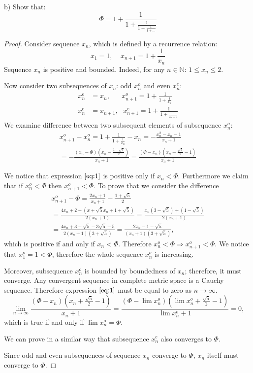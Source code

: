 \documentclass{article}
\newcommand{\N}{\mathbb{N}}
\begin{document}
\begin{tcolorbox}
b) Show that:
\[ \Phi = 1+\frac{1}{1+\frac{1}{1+\frac{1}{1+\dots}}} \]
\end{tcolorbox}

\begin{proof}

Consider sequence $x_n$, which is defined by a recurrence relation:
\[ x_1 = 1, \>\>\>\>\> x_{n+1} = 1+\frac{1}{x_n} \]
Sequence $x_n$ is positive and bounded.
Indeed, for any $n \in \N$: $1 \leq x_n \leq 2 $.

Now consider two subsequences of $x_n$: odd $x^o_n$ and even $x^e_n$:
\begin{align*}
    x^o_n & = x_n, \quad\>\>\> x^o_{n+1} = 1+\frac{1}{1+\frac{1}{x_n}} \\
    x^e_n & = x_{n+1}, \>\>\> x^e_{n+1} = 1 + \frac{1}{1+\frac{1}{x_{n+1}}}
\end{align*}
We examine difference between two subsequent elements of subsequence $x^o_{n}$:
\begin{multline} \label{eq:1}
    x^o_{n+1} - x^o_{n} 
    = 1 + \frac{1}{1+\frac{1}{x_n}} - x_n 
    = - \frac{x_n^2 - x_n - 1}{x_n + 1} \\
    = -\frac{(x_n-\Phi)(x_n-\frac{1-\sqrt{5}}{2})}{x_n+1} 
    = \frac{(\Phi-x_n)(x_n+\frac{\sqrt{5}}{2}-1)}{x_n+1}    
\end{multline}

We notice that expression $\ref{eq:1}$ is positive only if $x_n < \Phi$.
Furthermore we claim that if $x^o_n < \Phi$ then $x^o_{n+1} < \Phi$.
To prove that we consider the difference 
\begin{multline*}
    x^o_{n+1} - \Phi = \frac{2x_n+1}{x_n+1} - \frac{1+\sqrt{5}}{2} \\
    = \frac{4x_n+2-(x+\sqrt{5}x_n + 1 + \sqrt{5})}{2(x_n+1)}
    = \frac{x_n(3-\sqrt{5})+(1-\sqrt{5})}{2(x_n+1)} \\
    = \frac{4x_n + 3 + \sqrt{5} - 3\sqrt{5}-5}{2(x_n+1)(3+\sqrt{5})} = \frac{2x_n-1-\sqrt{5}}{(x_n+1)(3+\sqrt{5})},    
\end{multline*}
which is positive if and only if $x_n < \Phi$.
Therefore $x^o_n < \Phi \Rightarrow x^o_{n+1} < \Phi$.
We notice that $x^o_1 = 1 < \Phi$, therefore the whole sequence $x^o_n$ is increasing.

Moreover, subsequence $x^o_n$ is bounded by boundedness of $x_n$; therefore, it must converge.
Any convergent sequence in complete metric space is a Cauchy sequence.
Therefore expression $\ref{eq:1}$ must be equal to zero as $n \to \infty$.
\[
    \lim_{n \to \infty} \frac{(\Phi-x_n)(x_n+\frac{\sqrt{5}}{2}-1)}{x_n+1} 
    = \frac{(\Phi-\lim x^o_n)(\lim x^o_n+\frac{\sqrt{5}}{2}-1)}{\lim x^o_n+1} = 0,
\]
which is true if and only if $\lim x^o_n = \Phi$.

We can prove in a similar way that subsequence $x^e_n$ also converges to $\Phi$.

Since odd and even subsequences of sequence $x_n$ converge to $\Phi$, $x_n$ itself must converge to $\Phi$.

\end{proof}
\end{document}
